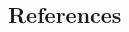 \documentclass[5p]{elsarticle}
\begin{document}
\begin{CJK}{UTF8}{gbsn}



\section*{References}


\end{CJK}
\end{document}
